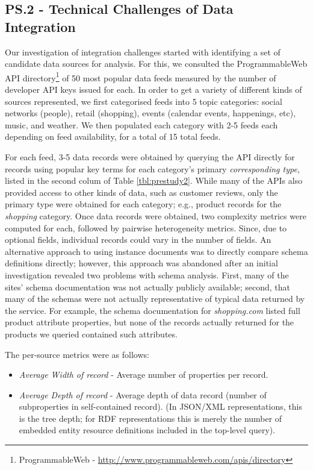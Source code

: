 \documentclass{sigchi}
\begin{document}
\subsection{PS.2 - Technical Challenges of Data Integration}
Our investigation of integration challenges started with identifying a set of candidate data sources for analysis.  For this, we consulted the ProgrammableWeb API directory\footnote{ProgrammableWeb - \url{http://www.programmableweb.com/apis/directory}} of 50 most popular data feeds measured by the number of developer API keys issued for each.  In order to get a variety of different kinds of sources represented, we first categorised feeds into 5 topic categories: social networks (people), retail (shopping), events (calendar events, happenings, etc), music, and weather. We then populated each category with 2-5 feeds each depending on feed availability, for a total of 15 total feeds.  

For each feed, 3-5 data records were obtained by querying the API directly for records using popular key terms for each category's primary \emph{corresponding type}, listed in the second colum of Table \ref{tbl:prestudy2}. While many of the APIs also provided access to other kinds of data, such as customer reviews, only the primary type were obtained for each category; e.g., product records for the \emph{shopping} category.  Once data records were obtained, two complexity metrics were computed for each, followed by pairwise heterogeneity metrics.  Since, due to optional fields,  individual records could vary in the number of fields.  An alternative approach to using instance documents was to directly compare schema definitions directly; however, this approach was abandoned after an initial investigation revealed two problems with schema analysis.  First, many of the sites' schema documentation was not actually publicly available; second, that many of the schemas were not actually representative of typical data returned by the service. For example, the schema documentation for \emph{shopping.com} listed full product attribute properties, but none of the records actually returned for the products we queried contained such attributes. 

The per-source metrics were as follows:
\begin{itemize}
\item \emph{Average Width of record} - Average number of properties per record.
\item \emph{Average Depth of record} - Average depth of data record (number of subproperties in self-contained record). (In JSON/XML representations, this is the tree depth; for RDF  representations this is merely the number of embedded entity resource definitions included in the top-level query).
\end{itemize}
\end{document}
